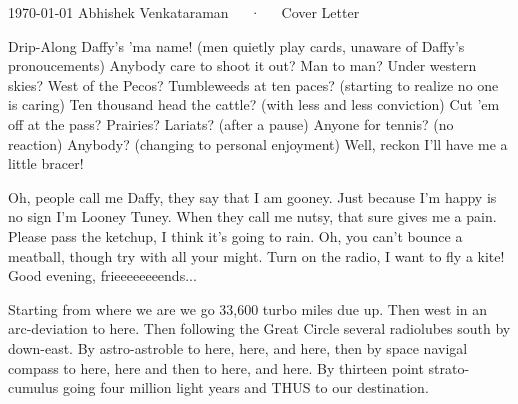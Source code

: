 \documentclass[11pt, a4paper]{awesome-cv}
\begin{document}
\makecvheader[R]

\makecvfooter
  {\today}
  {Abhishek Venkataraman~~~·~~~Cover Letter}
  {}

\makelettertitle

\begin{cvletter}

Drip-Along Daffy's 'ma name! (men quietly play cards, unaware of Daffy's pronoucements) Anybody care to shoot it out? Man to man? Under western skies? West of the Pecos? Tumbleweeds at ten paces? (starting to realize no one is caring) Ten thousand head the cattle? (with less and less conviction) Cut 'em off at the pass? Prairies? Lariats? (after a pause) Anyone for tennis? (no reaction) Anybody? (changing to personal enjoyment) Well, reckon I'll have me a little bracer!

Oh, people call me Daffy, they say that I am gooney. Just because I'm happy is no sign I'm Looney Tuney.
When they call me nutsy, that sure gives me a pain. Please pass the ketchup, I think it's going to rain.
Oh, you can't bounce a meatball, though try with all your might. Turn on the radio, I want to fly a kite!
Good evening, frieeeeeeeends...

Starting from where we are we go 33,600 turbo miles due up. Then west in an arc-deviation to here. Then following the Great Circle several radiolubes south by down-east. By astro-astroble to here, here, and here, then by space navigal compass to here, here and then to here, and here. By thirteen point strato-cumulus going four million light years and THUS to our destination.


\end{cvletter}


\makeletterclosing
\end{document}
